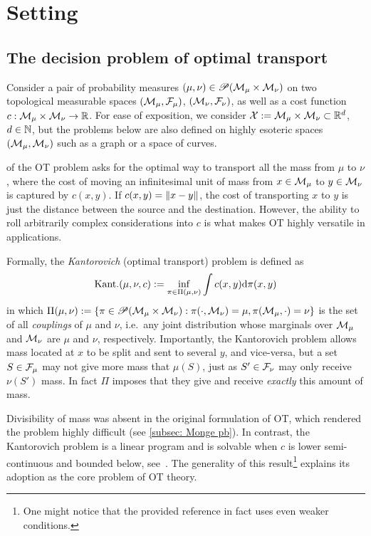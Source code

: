 \section{Setting}\label{sec: setting}
\subsection{The decision problem of optimal transport}\label{subsec:decision problem setting}


Consider a pair of probability measures $(\mu,\nu)\in\mathscr{P}(\mathcal{M}_\mu\times\mathcal{M}_\nu)$ on two topological measurable spaces $(\mathcal{M}_\mu,\mathcal{F}_\mu)$, $(\mathcal{M}_\nu,\mathcal{F}_\nu)$, as well as a cost function $c:\mathcal{M}_\mu\times\mathcal{M}_\nu\to\mathbb{R}$. For ease of exposition, we consider $\mathcal{X}:=\mathcal{M}_\mu\times\mathcal{M}_\nu\subset\mathbb{R}^d$, $d\in\mathbb{N}$, but the problems below are also defined on highly esoteric spaces $(\mathcal{M}_\mu,\mathcal{M}_\nu)$ such as a graph or a space of curves.

 of the OT problem \citep{kantorovich_translocation_2006} asks for the optimal way to transport all the mass from $\mu$ to $\nu$, where the cost of moving an infinitesimal unit of mass from $x\in\mathcal{M}_\mu$ to $y\in\mathcal{M}_\nu$ is captured by $c(x,y)$. If $c(x,y)=\left\lVert x-y\right\rVert$, the cost of transporting $x$ to $y$ is just the distance between the source and the destination. However, the ability to roll arbitrarily complex considerations into $c$ is what makes OT highly versatile in applications.  

Formally, the \emph{Kantorovich} (optimal transport) problem is defined as
\begin{align}
    \text{Kant.}(\mu,\nu,c):= \inf_{\pi\in\Pi(\mu,\nu)}\int c(x,y)\mathrm{d} \pi(x,y)
    \label{eq: kantorovich def}
\end{align}
in which
$ 
    \Pi(\mu,\nu):=\{\pi\in\mathscr{P}(\mathcal{M}_\mu\times\mathcal{M}_\nu): \pi(\cdot,\mathcal{M}_\nu)=\mu, \pi(\mathcal{M}_\mu,\cdot)=\nu\}
$
is the set of all \textit{couplings} of $\mu$ and $\nu$, i.e.\ any joint distribution whose marginals over $\mathcal{M}_\mu$ and $\mathcal{M}_\nu$ are $\mu$ and $\nu$, respectively. Importantly, the Kantorovich problem allows mass located at $x$ to be split and sent to several $y$, and vice-versa, but a set $S\in\mathcal{F}_\mu$ may not give more mass that $\mu(S)$, just as $S'\in\mathcal{F}_\nu$ may only receive $\nu(S')$ mass. In fact $\Pi$ imposes that they give and receive \emph{exactly} this amount of mass.

Divisibility of mass was absent in the original formulation of OT, which rendered the problem highly difficult (see \cref{subsec: Monge pb}). In contrast, the Kantorovich problem is a linear program and is solvable when $c$ is lower semi-continuous and bounded below, see~\cite[Thm.~4.1]{villani_optimal_2009}. The generality of this result\footnote{One might notice that the provided reference in fact uses even weaker conditions.} explains its adoption as the core problem of OT theory.

